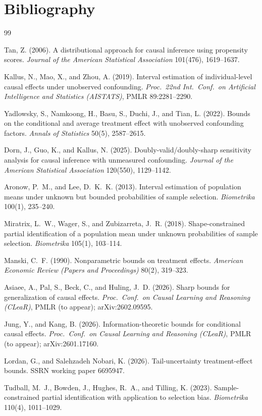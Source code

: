 \documentclass[11pt]{article}
\theoremstyle{definition}
\theoremstyle{plain}
\theoremstyle{remark}
\begin{document}
\section*{Bibliography}
\begin{thebibliography}{99}

 Tan, Z. (2006). A distributional approach for causal inference using propensity scores. \emph{Journal of the American Statistical Association} 101(476), 1619--1637.

 Kallus, N., Mao, X., and Zhou, A. (2019). Interval estimation of individual-level causal effects under unobserved confounding. \emph{Proc.\ 22nd Int.\ Conf.\ on Artificial Intelligence and Statistics (AISTATS)}, PMLR 89:2281--2290.

 Yadlowsky, S., Namkoong, H., Basu, S., Duchi, J., and Tian, L. (2022). Bounds on the conditional and average treatment effect with unobserved confounding factors. \emph{Annals of Statistics} 50(5), 2587--2615.

 Dorn, J., Guo, K., and Kallus, N. (2025). Doubly-valid/doubly-sharp sensitivity analysis for causal inference with unmeasured confounding. \emph{Journal of the American Statistical Association} 120(550), 1129--1142.

 Aronow, P.~M., and Lee, D.~K.~K. (2013). Interval estimation of population means under unknown but bounded probabilities of sample selection. \emph{Biometrika} 100(1), 235--240.

 Miratrix, L.~W., Wager, S., and Zubizarreta, J.~R. (2018). Shape-constrained partial identification of a population mean under unknown probabilities of sample selection. \emph{Biometrika} 105(1), 103--114.

 Manski, C.~F. (1990). Nonparametric bounds on treatment effects. \emph{American Economic Review (Papers and Proceedings)} 80(2), 319--323.

 Asiaee, A., Pal, S., Beck, C., and Huling, J.~D. (2026). Sharp bounds for generalization of causal effects. \emph{Proc.\ Conf.\ on Causal Learning and Reasoning (CLeaR)}, PMLR (to appear); arXiv:2602.09595.

 Jung, Y., and Kang, B. (2026). Information-theoretic bounds for conditional causal effects. \emph{Proc.\ Conf.\ on Causal Learning and Reasoning (CLeaR)}, PMLR (to appear); arXiv:2601.17160.

 Lordan, G., and Salehzadeh Nobari, K. (2026). Tail-uncertainty treatment-effect bounds. SSRN working paper 6695947.

 Tudball, M.~J., Bowden, J., Hughes, R.~A., and Tilling, K. (2023). Sample-constrained partial identification with application to selection bias. \emph{Biometrika} 110(4), 1011--1029.

\end{thebibliography}
\end{document}

